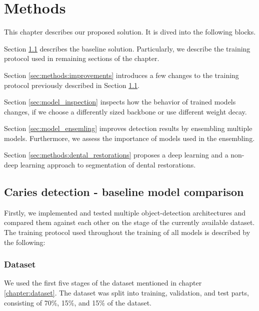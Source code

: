 \chapter{Methods}
\label{chapter:methods}
This chapter describes our proposed solution. It is dived into the following blocks.

\medskip 
Section \ref{sec:caries_detection} describes the baseline solution. Particularly, we describe the training protocol used in remaining sections of the chapter.

\medskip Section \ref{sec:methods:improvements} introduces a few changes to the training protocol previously described in Section \ref{sec:caries_detection}.

\medskip Section \ref{sec:model_inspection} inspects how the behavior of trained models changes, if we choose a differently sized backbone or use different weight decay.

\medskip Section \ref{sec:model_ensemling} improves detection results by ensembling multiple models. Furthermore, we assess the importance of models used in the ensembling.

\medskip Section \ref{sec:methods:dental_restorations} proposes a deep learning and a non-deep learning approach to segmentation of dental restorations.

\section{Caries detection - baseline model comparison}
\label{sec:caries_detection}

Firstly, we implemented and tested multiple object-detection architectures and compared them against each other on the stage of the currently available dataset. The training protocol used throughout the training of all models is described by the following:

\subsection{Dataset}
We used the first five stages of the dataset mentioned in chapter \ref{chapter:dataset}. The dataset was split into training, validation, and test parts, consisting of 70\%, 15\%, and 15\% of the dataset.

